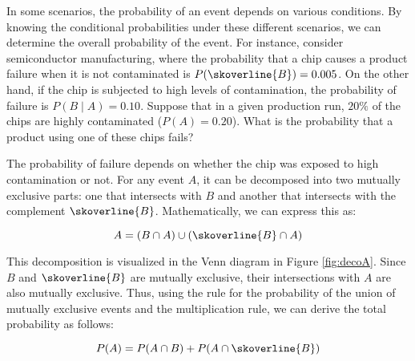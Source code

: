 In some scenarios, the probability of an event depends on various conditions. By knowing the conditional probabilities under these different scenarios, we can determine the overall probability of the event. For instance, consider semiconductor manufacturing, where the probability that a chip causes a product failure when it is not contaminated is \( P(\skoverline{B}) = 0.005 \). On the other hand, if the chip is subjected to high levels of contamination, the probability of failure is \( P(B \mid A) = 0.10 \). Suppose that in a given production run, \( 20\% \) of the chips are highly contaminated (\( P(A) = 0.20 \)). What is the probability that a product using one of these chips fails?

The probability of failure depends on whether the chip was exposed to high contamination or not. For any event \( A \), it can be decomposed into two mutually exclusive parts: one that intersects with \( B \) and another that intersects with the complement \( \skoverline{B} \). Mathematically, we can express this as:

\[
A = (B \cap A) \cup (\skoverline{B} \cap A)
\]

This decomposition is visualized in the Venn diagram in Figure \ref{fig:decoA}. Since \( B \) and \( \skoverline{B} \) are mutually exclusive, their intersections with \( A \) are also mutually exclusive. Thus, using the rule for the probability of the union of mutually exclusive events and the multiplication rule, we can derive the total probability as follows:

\[
P(A) = P(A \cap B) + P(A \cap \skoverline{B})
\]

\def\firstellipse{(3,1) ellipse (4.5cm and 2.2cm)} %




